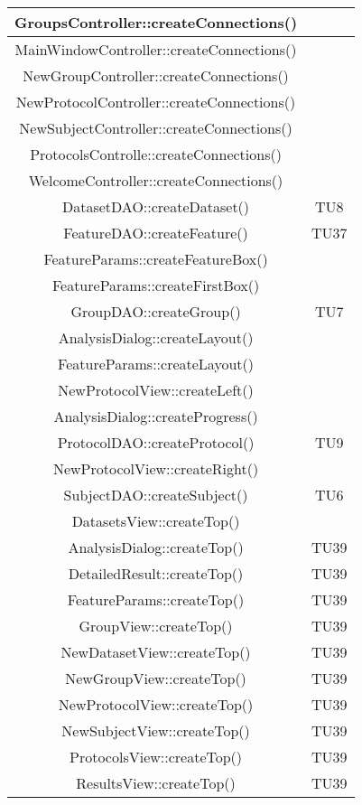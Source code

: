 \begin{center}
\begin{longtable}{|c|c|}
\hline 
GroupsController::createConnections() &  \\
\hline 
MainWindowController::createConnections() &  \\
\hline 
NewGroupController::createConnections() &  \\
\hline 
NewProtocolController::createConnections() &  \\
\hline 
NewSubjectController::createConnections() &  \\
\hline 
ProtocolsControlle::createConnections() &  \\
\hline 
WelcomeController::createConnections() &  \\
\hline 
DatasetDAO::createDataset() & TU8 \\
\hline 
FeatureDAO::createFeature() & TU37 \\
\hline 
FeatureParams::createFeatureBox() &  \\
\hline 
FeatureParams::createFirstBox() &  \\
\hline 
GroupDAO::createGroup() & TU7 \\
\hline 
AnalysisDialog::createLayout() &  \\
\hline 
FeatureParams::createLayout() &  \\
\hline 
NewProtocolView::createLeft() &  \\
\hline 
AnalysisDialog::createProgress() &  \\
\hline 
ProtocolDAO::createProtocol() & TU9 \\
\hline 
NewProtocolView::createRight() &  \\
\hline 
SubjectDAO::createSubject() & TU6 \\
\hline 
DatasetsView::createTop() &  \\
\hline 
AnalysisDialog::createTop() & TU39 \\
\hline 
DetailedResult::createTop() & TU39 \\
\hline 
FeatureParams::createTop() & TU39 \\
\hline 
GroupView::createTop() & TU39 \\
\hline 
NewDatasetView::createTop() & TU39 \\
\hline 
NewGroupView::createTop() & TU39 \\
\hline 
NewProtocolView::createTop() & TU39 \\
\hline 
NewSubjectView::createTop() & TU39 \\
\hline 
ProtocolsView::createTop() & TU39 \\
\hline 
ResultsView::createTop() & TU39 \\

\end{longtable}
\end{center}
